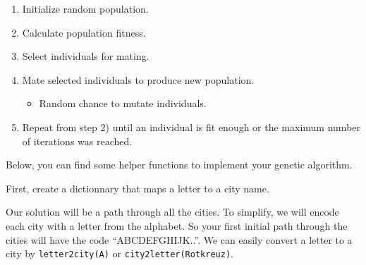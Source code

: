 \documentclass[11pt]{article}
\providecommand{\tightlist}{%
      \setlength{\itemsep}{0pt}\setlength{\parskip}{0pt}}
\begin{document}
\begin{enumerate}
\def\labelenumi{\arabic{enumi})}
\item
  Initialize random population.
\item
  Calculate population fitness.
\item
  Select individuals for mating.
\item
  Mate selected individuals to produce new population.

  \begin{itemize}
  \tightlist
  \item
    Random chance to mutate individuals.
  \end{itemize}
\item
  Repeat from step 2) until an individual is fit enough or the maximum
  number of iterations was reached.
\end{enumerate}

Below, you can find some helper functions to implement your genetic
algorithm.

First, create a dictionnary that maps a letter to a city name.

    Our solution will be a path through all the cities. To simplify, we will
encode each city with a letter from the alphabet. So your first initial
path through the cities will have the code ``ABCDEFGHIJK..''. We can
easily convert a letter to a city by
\texttt{letter2city(\textquotesingle{}A\textquotesingle{})} or
\texttt{city2letter(\textquotesingle{}Rotkreuz\textquotesingle{})}.
\end{document}
